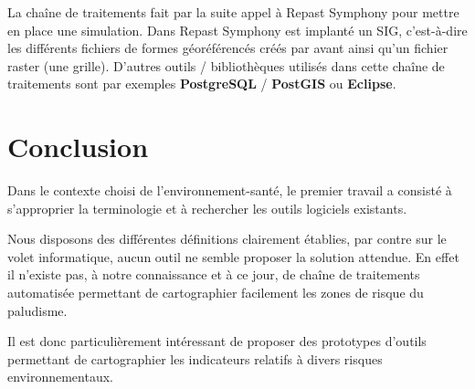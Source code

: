 La chaîne de traitements fait par la suite appel à Repast Symphony pour mettre en place une simulation. Dans Repast Symphony est implanté un SIG, c'est-à-dire les différents fichiers de formes géoréférencés créés par avant ainsi qu'un fichier raster (une grille). D'autres outils / bibliothèques utilisés dans cette chaîne de traitements sont par exemples \textbf{PostgreSQL} / \textbf{PostGIS} ou \textbf{Eclipse}.


\section{Conclusion}

Dans le contexte choisi de l'environnement-santé, le premier travail a consisté à s'approprier la terminologie et à rechercher les outils logiciels existants.

Nous disposons des différentes définitions clairement établies, par contre sur le volet informatique, aucun outil ne semble proposer la solution attendue. En effet il n'existe pas, à notre connaissance et à ce jour, de chaîne de traitements automatisée permettant de cartographier facilement les zones de risque du paludisme. 

Il est donc particulièrement intéressant de proposer des prototypes d'outils permettant de cartographier les indicateurs relatifs à divers risques environnementaux. 

